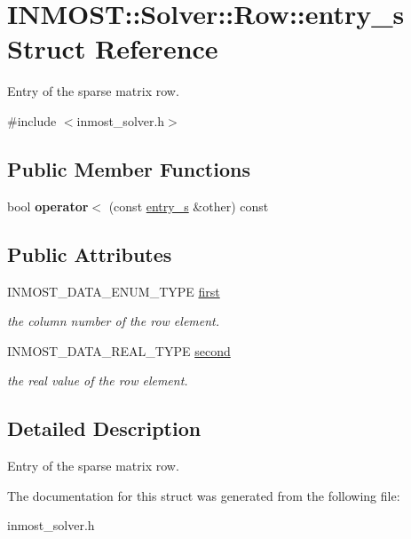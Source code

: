 \hypertarget{structINMOST_1_1Solver_1_1Row_1_1entry__s}{\section{I\-N\-M\-O\-S\-T\-:\-:Solver\-:\-:Row\-:\-:entry\-\_\-s Struct Reference}
\label{structINMOST_1_1Solver_1_1Row_1_1entry__s}
}


Entry of the sparse matrix row.  




{\ttfamily \#include $<$inmost\-\_\-solver.\-h$>$}

\subsection*{Public Member Functions}
\begin{DoxyCompactItemize}
\item 
\hypertarget{structINMOST_1_1Solver_1_1Row_1_1entry__s_a2011a0b36b0a8f2f41b050d1d6edd21a}{bool {\bfseries operator$<$} (const \hyperlink{structINMOST_1_1Solver_1_1Row_1_1entry__s}{entry\-\_\-s} \&other) const }\label{structINMOST_1_1Solver_1_1Row_1_1entry__s_a2011a0b36b0a8f2f41b050d1d6edd21a}

\end{DoxyCompactItemize}
\subsection*{Public Attributes}
\begin{DoxyCompactItemize}
\item 
\hypertarget{structINMOST_1_1Solver_1_1Row_1_1entry__s_a803fc52ee731fd9eedaf3cf538fc260b}{I\-N\-M\-O\-S\-T\-\_\-\-D\-A\-T\-A\-\_\-\-E\-N\-U\-M\-\_\-\-T\-Y\-P\-E \hyperlink{structINMOST_1_1Solver_1_1Row_1_1entry__s_a803fc52ee731fd9eedaf3cf538fc260b}{first}}\label{structINMOST_1_1Solver_1_1Row_1_1entry__s_a803fc52ee731fd9eedaf3cf538fc260b}

\begin{DoxyCompactList}\small\item\em the column number of the row element. \end{DoxyCompactList}\item 
\hypertarget{structINMOST_1_1Solver_1_1Row_1_1entry__s_ad2eace67073a2fbea39fb18a41af25e9}{I\-N\-M\-O\-S\-T\-\_\-\-D\-A\-T\-A\-\_\-\-R\-E\-A\-L\-\_\-\-T\-Y\-P\-E \hyperlink{structINMOST_1_1Solver_1_1Row_1_1entry__s_ad2eace67073a2fbea39fb18a41af25e9}{second}}\label{structINMOST_1_1Solver_1_1Row_1_1entry__s_ad2eace67073a2fbea39fb18a41af25e9}

\begin{DoxyCompactList}\small\item\em the real value of the row element. \end{DoxyCompactList}\end{DoxyCompactItemize}


\subsection{Detailed Description}
Entry of the sparse matrix row. 

The documentation for this struct was generated from the following file\-:\begin{DoxyCompactItemize}
\item 
inmost\-\_\-solver.\-h\end{DoxyCompactItemize}
